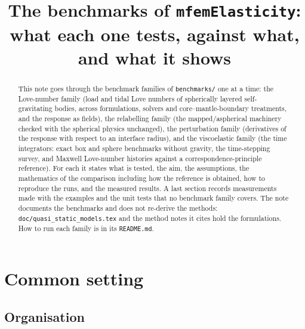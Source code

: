 \documentclass[11pt]{article}
\title{The benchmarks of \texttt{mfemElasticity}:\\
       what each one tests, against what, and what it shows}
\author{}
\date{}
\numberwithin{equation}{section}
\newcommand{\code}[1]{\texttt{#1}}
\begin{document}
\maketitle

\begin{abstract}
\noindent
This note goes through the benchmark families of \code{benchmarks/} one at
a time: the Love-number family (load and tidal Love numbers of spherically
layered self-gravitating bodies, across formulations, solvers and
core--mantle-boundary treatments, and the response as fields), the
relabelling family (the mapped/aspherical machinery checked with
the spherical physics unchanged), the perturbation family (derivatives of
the response with respect to an interface radius), and the viscoelastic
family (the time integrators: exact box and sphere benchmarks without
gravity, the time-stepping survey, and Maxwell Love-number histories
against a correspondence-principle reference). For each it states what is
tested, the aim, the assumptions, the mathematics of the comparison
including how the reference is obtained, how to reproduce the runs, and the
measured results. A last section records measurements made with the
examples and the unit tests that no benchmark family covers. The note
documents the benchmarks and does not re-derive the methods:
\code{doc/quasi\_static\_models.tex} and the method notes it cites hold the
formulations. How to run each family is in its \code{README.md}.
\end{abstract}

\tableofcontents

\section{Common setting}
\label{sec:common}

\subsection{Organisation}
\label{sec:organisation}
\end{document}
